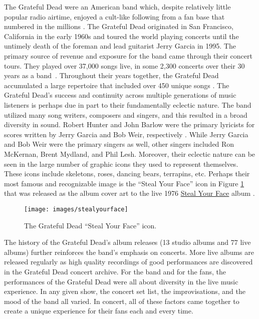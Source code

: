 \documentclass{svmult}
\newcommand{\album}[1]{\uline{#1}}
\begin{document}
The Grateful Dead were an American band which, despite relatively little popular radio airtime, enjoyed a cult-like following from a fan base that numbered in the millions \cite{trip:mcnally2002}. The Grateful Dead originated in San Francisco, California in the early 1960s and toured the world playing concerts until the untimely death of the foreman and lead guitarist Jerry Garcia in 1995. The primary source of revenue and exposure for the band came through their concert tours.   They played over 37,000 songs live, in some 2,300 concerts over their 30 years as a band~\cite{setlists:1996}. Throughout their years together, the Grateful Dead accumulated a large repertoire that included over 450 unique songs \cite{setlists:1996}. The Grateful Dead's success and continuity across multiple generations of music listeners is perhaps due in part to their fundamentally eclectic nature. The band utilized many song writers, composers and singers, and this resulted in a broad diversity in sound. Robert Hunter and John Barlow were the primary lyricists for scores written by Jerry Garcia and Bob Weir, respectively \cite{annotatedead:dobb2007}. While Jerry Garcia and Bob Weir were the primary singers as well, other singers included Ron McKernan, Brent Mydland, and Phil Lesh. Moreover, their eclectic nature can be seen in the large number of graphic icons they used to represent themselves. These icons include skeletons, roses, dancing bears, terrapins, etc. Perhaps their most famous and recognizable image is the ``Steal Your Face'' icon in Figure \ref{fig:stealyourface} that was released as the album cover art to the live 1976 \album{Steal Your Face} album \cite{stealface:dead1976}.
\begin{figure}[ht!]
\begin{center}
\texttt{[image: images/stealyourface]}
\caption{\label{fig:stealyourface}The Grateful Dead ``Steal Your Face'' icon.}
\end{center}
\end{figure}

The history of the Grateful Dead's album releases (13 studio albums and 77 live albums) further reinforces the band's emphasis on concerts.  More live albums are released regularly as high quality recordings of good performances are discovered in the Grateful Dead concert archive. For the band and for the fans, the performances of the Grateful Dead were all about diversity in the live music experience. In any given show, the concert set list, the improvisations, and the mood of the band all varied. In concert, all of these factors came together to create a unique experience for their fans each and every time. 
\end{document}
